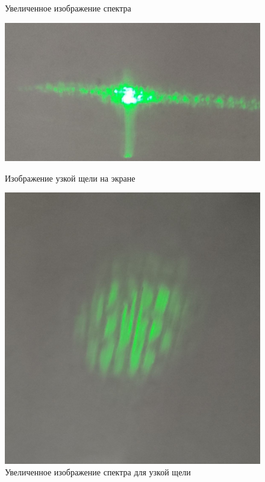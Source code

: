 \documentclass[a4paper, 12pt]{article}%
\begin{document}
\begin{enumerate}
\begin{figure}[h!]
\begin{center}
\begin{minipage}[h!]{0.48\linewidth}
                \caption{Увеличенное изображение спектра}
                \label{picture_3}
            \end{minipage}
        \end{center}
    \end{figure}
    
    \begin{figure}[h!]
        \begin{center}
            \begin{minipage}[h!]{0.48\linewidth}
                \includegraphics[width=1\linewidth]{images/img_5.jpg}
                \caption{Изображение узкой щели на экране}
                \label{picture_2}
            \end{minipage}
            \hfill
            \begin{minipage}[h!]{0.48\linewidth}
                \includegraphics[width=1\linewidth]{images/img_4.jpg}
                \caption{Увеличенное изображение спектра для узкой щели}
                \label{picture_3}
            \end{minipage}
        \end{center}
    \end{figure}


\end{enumerate}
\end{document}
